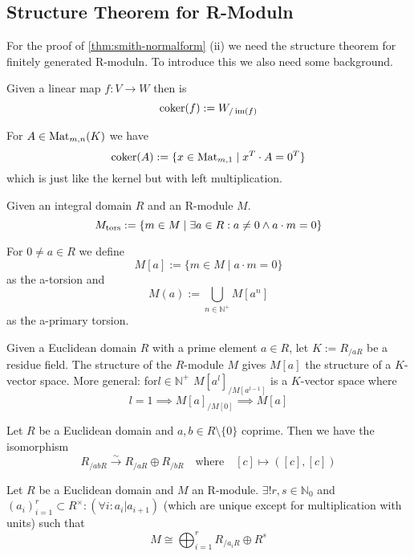\subsection{Structure Theorem for R-Moduln}
For the proof of \cref{thm:smith-normalform} (ii) we need the structure theorem for finitely generated R-moduln.
To introduce this we also need some background.

\begin{definition}[Cokernel]
   Given a linear map \(f: V \to W\) then is
   \[\operatorname{coker}(f) := W_{/\operatorname{im}(f)}\]
\end{definition}
\begin{remark}
   For \(A \in \operatorname{Mat}_{m, n}(K)\) we have
   \[\operatorname{coker}(A) := \{x \in \operatorname{Mat}_{m, 1} \mid x^T \cdot A = 0^T\}\]
   which is just like the kernel but with left multiplication.
\end{remark}

\begin{definition}[Torsion]
   Given an integral domain \(R\) and an R-module \(M\).
   \[M_{\operatorname{tors}} := \{m \in M \mid \exists a \in R: a \neq 0 \land a \cdot m = 0\}\]
\end{definition}
\begin{remark}
   For \(0 \neq a \in R\) we define
   \[M[a] := \{m \in M \mid a \cdot m = 0\}\]
   as the a-torsion and
   \[M(a) := \bigcup_{n \in \mathbb{N}^+} M[a^n]\]
   as the a-primary torsion.

   Given a Euclidean domain \(R\) with a prime element \(a \in R\), let \(K := R_{/aR}\) be a residue field.
   The structure of the \(R\)-module \(M\) gives \(M[a]\) the structure of a \(K\)-vector space.
   More general: for\(l \in \mathbb{N}^+\) \(M[a^l]_{/M[a^{l-1}]}\) is a \(K\)-vector space where
   \[l = 1 \implies M[a]_{/M[0]} \implies M[a]\]
\end{remark}

\begin{lemma}\label{lem:chin_remainder}
   Let \(R\) be a Euclidean domain and \(a, b \in R \setminus \{0\}\) coprime.
   Then we have the isomorphism
   \[R_{/abR} \xrightarrow{\sim} R_{/aR} \oplus R_{/bR} \quad\text{where}\quad [c] \mapsto ([c], [c])\]
\end{lemma}

\begin{theorem}\label{thm:fund_thm_mod}
   Let \(R\) be a Euclidean domain and \(M\) an R-module.
   \(\exists! r, s \in \mathbb{N}_0\) and \((a_i)_{i=1}^r \subset R^\times: (\forall i: a_i | a_{i+1})\) (which are unique except for multiplication with units) such that
   \[M \cong \bigoplus_{i=1}^r R_{/a_iR} \oplus R^s\]
\end{theorem}

